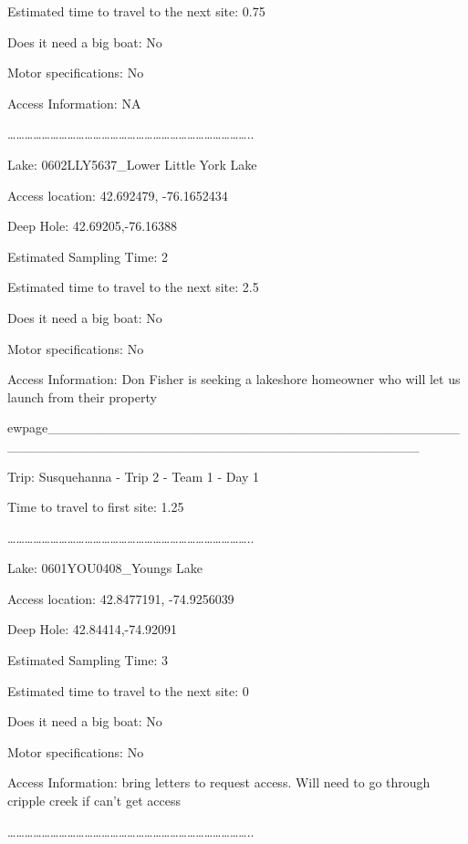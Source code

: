 \documentclass[]{article}
\begin{document}
Estimated time to travel to the next site: 0.75

Does it need a big boat: No

Motor specifications: No

Access Information: NA

\ldots{}\ldots{}\ldots{}\ldots{}\ldots{}\ldots{}\ldots{}\ldots{}\ldots{}\ldots{}\ldots{}\ldots{}\ldots{}\ldots{}\ldots{}\ldots{}\ldots{}\ldots{}\ldots{}\ldots{}\ldots{}\ldots{}\ldots{}\ldots{}\ldots{}\ldots{}\ldots{}\ldots{}..

Lake: 0602LLY5637\_Lower Little York Lake

Access location: 42.692479, -76.1652434

Deep Hole: 42.69205,-76.16388

Estimated Sampling Time: 2

Estimated time to travel to the next site: 2.5

Does it need a big boat: No

Motor specifications: No

Access Information: Don Fisher is seeking a lakeshore homeowner who will
let us launch from their property

ewpage\_\_\_\_\_\_\_\_\_\_\_\_\_\_\_\_\_\_\_\_\_\_\_\_\_\_\_\_\_\_\_\_\_\_\_\_\_\_\_\_\_\_\_\_\_\_\_\_\_\_\_\_\_\_\_\_\_\_\_\_\_\_\_\_\_\_\_\_\_\_\_\_\_\_\_\_\_\_\_\_\_\_\_\_\_\_

Trip: Susquehanna - Trip 2 - Team 1 - Day 1

Time to travel to first site: 1.25

\ldots{}\ldots{}\ldots{}\ldots{}\ldots{}\ldots{}\ldots{}\ldots{}\ldots{}\ldots{}\ldots{}\ldots{}\ldots{}\ldots{}\ldots{}\ldots{}\ldots{}\ldots{}\ldots{}\ldots{}\ldots{}\ldots{}\ldots{}\ldots{}\ldots{}\ldots{}\ldots{}\ldots{}..

Lake: 0601YOU0408\_Youngs Lake

Access location: 42.8477191, -74.9256039

Deep Hole: 42.84414,-74.92091

Estimated Sampling Time: 3

Estimated time to travel to the next site: 0

Does it need a big boat: No

Motor specifications: No

Access Information: bring letters to request access. Will need to go
through cripple creek if can't get access

\ldots{}\ldots{}\ldots{}\ldots{}\ldots{}\ldots{}\ldots{}\ldots{}\ldots{}\ldots{}\ldots{}\ldots{}\ldots{}\ldots{}\ldots{}\ldots{}\ldots{}\ldots{}\ldots{}\ldots{}\ldots{}\ldots{}\ldots{}\ldots{}\ldots{}\ldots{}\ldots{}\ldots{}..
\end{document}
